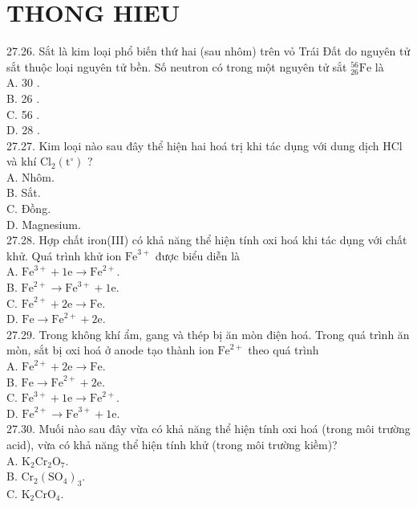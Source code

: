 \documentclass[10pt]{article}
\begin{document}
\section*{THONG HIEU}
27.26. Sắt là kim loại phổ biến thứ hai (sau nhôm) trên vỏ Trái Đất do nguyên tử sắt thuộc loại nguyên tử bền. Số neutron có trong một nguyên tử sắt ${ }_{26}^{56} \mathrm{Fe}$ là\\
A. 30 .\\
B. 26 .\\
C. 56 .\\
D. 28 .\\
27.27. Kim loại nào sau đây thể hiện hai hoá trị khi tác dụng với dung dịch HCl và khí $\mathrm{Cl}_{2}\left(\mathrm{t}^{\circ}\right)$ ?\\
A. Nhôm.\\
B. Sắt.\\
C. Đồng.\\
D. Magnesium.\\
27.28. Hợp chất iron(III) có khả năng thể hiện tính oxi hoá khi tác dụng với chất khử. Quá trình khử ion $\mathrm{Fe}^{3+}$ được biểu diễn là\\
A. $\mathrm{Fe}^{3+}+1 \mathrm{e} \rightarrow \mathrm{Fe}^{2+}$.\\
B. $\mathrm{Fe}^{2+} \rightarrow \mathrm{Fe}^{3+}+1 \mathrm{e}$.\\
C. $\mathrm{Fe}^{2+}+2 \mathrm{e} \rightarrow \mathrm{Fe}$.\\
D. $\mathrm{Fe} \rightarrow \mathrm{Fe}^{2+}+2 \mathrm{e}$.\\
27.29. Trong không khí ẩm, gang và thép bị ăn mòn điện hoá. Trong quá trình ăn mòn, sắt bị oxi hoá ở anode tạo thành ion $\mathrm{Fe}^{2+}$ theo quá trình\\
A. $\mathrm{Fe}^{2+}+2 \mathrm{e} \rightarrow \mathrm{Fe}$.\\
B. $\mathrm{Fe} \rightarrow \mathrm{Fe}^{2+}+2 \mathrm{e}$.\\
C. $\mathrm{Fe}^{3+}+1 \mathrm{e} \rightarrow \mathrm{Fe}^{2+}$.\\
D. $\mathrm{Fe}^{2+} \rightarrow \mathrm{Fe}^{3+}+1 \mathrm{e}$.\\
27.30. Muối nào sau đây vừa có khả năng thể hiện tính oxi hoá (trong môi trường acid), vừa có khả năng thể hiện tính khử (trong môi trường kiềm)?\\
A. $\mathrm{K}_{2} \mathrm{Cr}_{2} \mathrm{O}_{7}$.\\
B. $\mathrm{Cr}_{2}\left(\mathrm{SO}_{4}\right)_{3}$.\\
C. $\mathrm{K}_{2} \mathrm{CrO}_{4}$.\\
\end{document}
